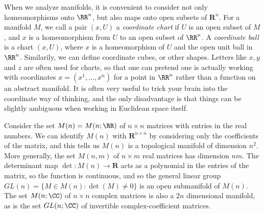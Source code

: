 When we analyze manifolds, it is convenient to consider not only homeomorphisms onto $\RR^n$, but also maps onto open subsets of $\mathbf{R}^n$. For a manifold $M$, we call a pair $(x,U)$ a \emph{coordinate chart} if $U$ is an open subset of $M$, and $x$ is a homeomorphism from $U$ to an open subset of $\RR^n$. A \emph{coordinate ball} is a chart $(x,U)$, where $x$ is a homeomorphism of $U$ and the open unit ball in $\RR^n$. Similarily, we can define coordinate cubes, or other shapes. Letters like $x,y$ and $z$ are often used for charts, so that one can pretend one is actually working with coordinates $x = (x^1,\dots,x^n)$ for a point in $\RR^n$ rather than a function on an abstract manifold. It is often very useful to trick your brain into the coordinate way of thinking, and the only disadvantage is that things can be slightly ambiguous when working in Euclidean space itself.

\begin{example}
    Consider the set $M(n) = M(n;\RR)$ of $n \times n$ matrices with entries in the real numbers. We can identify $M(n)$ with $\mathbf{R}^{n \times n}$ by considering only the coefficients of the matrix, and this tells us $M(n)$ is a topological manifold of dimension $n^2$. More generally, the set $M(n,m)$ of $n \times m$ real matrices has dimension $nm$. The determinant map $\det: M(n) \to \mathbf{R}$ acts as a polynomial in the entries of the matrix, so the function is continuous, and so the general linear group $GL(n) = \{ M \in M(n) : \det(M) \neq 0 \}$ is an open submanifold of $M(n)$. The set $M(n;\CC)$ of $n \times n$ complex matrices is also a $2n$ dimensional manifold, as is the set $GL(n;\CC)$ of invertible complex-coefficient matrices.
\end{example}

